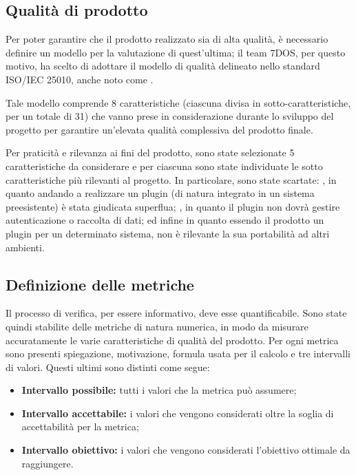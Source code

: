 \subsection{Qualità di prodotto}
Per poter garantire che il prodotto realizzato sia di alta qualità, è necessario definire un modello per la valutazione di quest'ultima; il team 7DOS, per questo motivo, ha scelto di adottare il modello di qualità delineato nello standard ISO/IEC 25010, anche noto come .

Tale modello comprende 8 caratteristiche (ciascuna divisa in sotto-caratteristiche, per un totale di 31) che vanno prese in considerazione durante lo sviluppo del progetto per garantire un'elevata qualità complessiva del prodotto finale.

Per praticità e rilevanza ai fini del prodotto, sono state selezionate 5 caratteristiche da considerare e per ciascuna sono state individuate le sotto caratteristiche più rilevanti al progetto. In particolare, sono state scartate: , in quanto andando a realizzare un plugin (di natura integrato in un sistema preesistente) è stata giudicata superflua; , in quanto il plugin non dovrà gestire autenticazione o raccolta di dati; ed infine  in quanto essendo il prodotto un plugin per un determinato sistema, non è rilevante la sua portabilità ad altri ambienti.

\subsection{Definizione delle metriche}
Il processo di verifica, per essere informativo, deve esse quantificabile. Sono state quindi stabilite delle metriche di natura numerica, in modo da misurare accuratamente le varie caratteristiche di qualità del prodotto. Per ogni metrica sono presenti  spiegazione, motivazione, formula usata per il calcolo e tre intervalli di valori. Questi ultimi sono distinti come segue:
\begin{itemize}
	\item {\textbf{Intervallo possibile:} tutti i valori che la metrica può assumere;}
	\item {\textbf{Intervallo accettabile:} i valori che vengono considerati oltre la soglia di accettabilità per la metrica;}
	\item {\textbf{Intervallo obiettivo:} i valori che vengono considerati l'obiettivo ottimale da raggiungere.}
\end{itemize}

